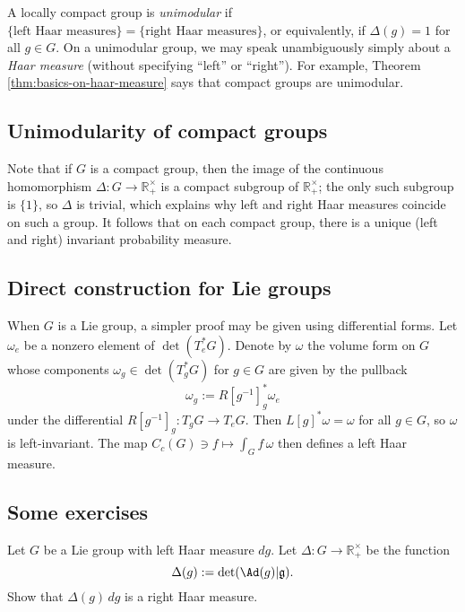 \documentclass[reqno]{amsart} 
\begin{document}
\begin{definition}
  A locally compact group is \emph{unimodular}
  if
  $\{\text{left Haar measures}\}
  = \{\text{right Haar measures}\}$,
  or equivalently, if $\Delta(g) = 1$ for all $g \in G$.
  On a unimodular group,
  we may speak unambiguously simply about a \emph{Haar measure}
  (without specifying ``left'' or ``right'').
  For example,
  Theorem \ref{thm:basics-on-haar-measure}
  says that compact groups are unimodular.
\end{definition}

\subsection{Unimodularity of compact groups}
\label{sec:org720d559}
Note that if $G$ is a compact group,
then the image of the continuous homomorphism $\Delta : G
\rightarrow \mathbb{R}_+^\times$
is a compact subgroup of $\mathbb{R}_+^\times$; the only such
subgroup
is $\{1\}$, so $\Delta$ is trivial, which explains why left and
right Haar measures
coincide on such a group.
It follows that on each compact group, there is a unique (left
and right)
invariant probability measure.

\subsection{Direct construction for Lie groups\label{sec:inv-measure-lie}}
\label{sec:orgb26c793}
When $G$ is a Lie group, a simpler proof may be given using differential forms.
Let $\omega_e$ be a nonzero element of $\det(T_e^* G)$.
Denote by $\omega$ the volume form
on $G$ whose components $\omega_g \in \det(T_g^* G)$ for
$g \in G$ are given by
the pullback
\begin{equation*}
  \omega_g := R[g^{-1}]^*_g \omega_e
\end{equation*}
under the differential $R[g^{-1}]_g : T_g G \rightarrow T_e G$.
Then $L[g]^* \omega = \omega$ for all $g \in G$, so $\omega$
is left-invariant.
The map $C_c(G) \ni f \mapsto \int_G f \, \omega$ then defines a
left Haar measure.

\subsection{Some exercises}
\label{sec:org02a337d}
\begin{exercise}
  Let $G$ be a Lie group with left Haar measure $d g$.
  Let $\Delta : G \rightarrow \mathbb{R}^\times_+$
  be the function
  \begin{equation*}
  \Delta(g) := \det(\Ad(g) | \mathfrak{g}).
  \end{equation*}
  Show that $\Delta(g) \, d g$ is a right Haar measure.
\end{exercise}
\end{document}
